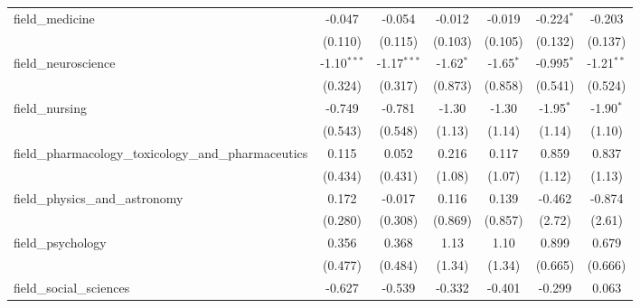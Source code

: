 \begin{tabular}{lcccccc}
   field\_medicine                                             & -0.047         & -0.054         & -0.012         & -0.019         & -0.224$^{*}$   & -0.203\\   
                                                               & (0.110)        & (0.115)        & (0.103)        & (0.105)        & (0.132)        & (0.137)\\   
   field\_neuroscience                                         & -1.10$^{***}$  & -1.17$^{***}$  & -1.62$^{*}$    & -1.65$^{*}$    & -0.995$^{*}$   & -1.21$^{**}$\\   
                                                               & (0.324)        & (0.317)        & (0.873)        & (0.858)        & (0.541)        & (0.524)\\   
   field\_nursing                                              & -0.749         & -0.781         & -1.30          & -1.30          & -1.95$^{*}$    & -1.90$^{*}$\\   
                                                               & (0.543)        & (0.548)        & (1.13)         & (1.14)         & (1.14)         & (1.10)\\   
   field\_pharmacology\_toxicology\_and\_pharmaceutics         & 0.115          & 0.052          & 0.216          & 0.117          & 0.859          & 0.837\\   
                                                               & (0.434)        & (0.431)        & (1.08)         & (1.07)         & (1.12)         & (1.13)\\   
   field\_physics\_and\_astronomy                              & 0.172          & -0.017         & 0.116          & 0.139          & -0.462         & -0.874\\   
                                                               & (0.280)        & (0.308)        & (0.869)        & (0.857)        & (2.72)         & (2.61)\\   
   field\_psychology                                           & 0.356          & 0.368          & 1.13           & 1.10           & 0.899          & 0.679\\   
                                                               & (0.477)        & (0.484)        & (1.34)         & (1.34)         & (0.665)        & (0.666)\\   
   field\_social\_sciences                                     & -0.627         & -0.539         & -0.332         & -0.401         & -0.299         & 0.063\\   

\end{tabular}
